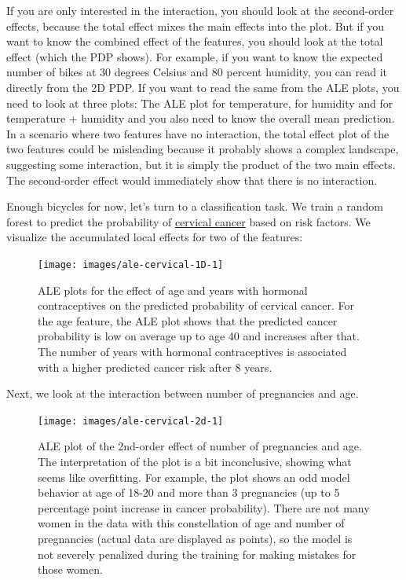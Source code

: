 \documentclass[
  12pt,
]{krantz}
\begin{document}
If you are only interested in the interaction, you should look at the second-order effects, because the total effect mixes the main effects into the plot.
But if you want to know the combined effect of the features, you should look at the total effect (which the PDP shows).
For example, if you want to know the expected number of bikes at 30 degrees Celsius and 80 percent humidity, you can read it directly from the 2D PDP.
If you want to read the same from the ALE plots, you need to look at three plots:
The ALE plot for temperature, for humidity and for temperature + humidity and you also need to know the overall mean prediction.
In a scenario where two features have no interaction, the total effect plot of the two features could be misleading because it probably shows a complex landscape, suggesting some interaction, but it is simply the product of the two main effects.
The second-order effect would immediately show that there is no interaction.

Enough bicycles for now, let's turn to a classification task.
We train a random forest to predict the probability of \protect\hyperlink{cervical}{cervical cancer} based on risk factors.
We visualize the accumulated local effects for two of the features:

\begin{figure}

{\centering \texttt{[image: images/ale-cervical-1D-1]} 

}

\caption{ALE plots for the effect of age and years with hormonal contraceptives on the predicted probability of cervical cancer. For the age feature, the ALE plot shows that the predicted cancer probability is low on average up to age 40 and increases after that. The number of years with hormonal contraceptives is associated with a higher predicted cancer risk after 8 years.}\label{fig:ale-cervical-1D}
\end{figure}

Next, we look at the interaction between number of pregnancies and age.

\begin{figure}

{\centering \texttt{[image: images/ale-cervical-2d-1]} 

}

\caption{ALE plot of the 2nd-order effect of number of pregnancies and age. The interpretation of the plot is a bit inconclusive, showing what seems like overfitting. For example, the plot shows an odd model behavior at age of 18-20 and more than 3 pregnancies (up to 5 percentage point increase in cancer probability). There are not many women in the data with this constellation of age and number of pregnancies (actual data are displayed as points), so the model is not severely penalized during the training for making mistakes for those women.}\label{fig:ale-cervical-2d}
\end{figure}
\end{document}
